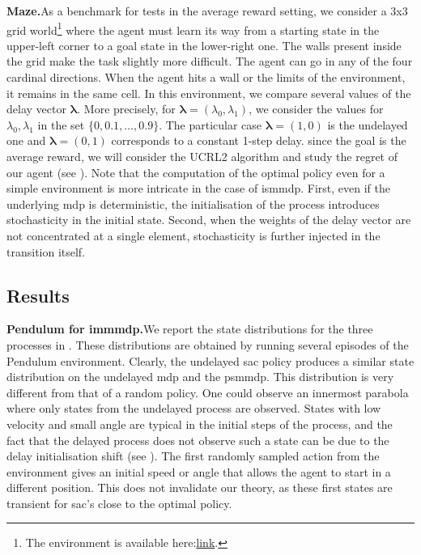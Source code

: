 \noindent\textbf{Maze.}\indent As a benchmark for tests in the average reward setting, we consider a 3x3 grid world\footnote{The environment is available here:\href{https://github.com/MattChanTK/gym-maze}{link}.} where the agent must learn its way from a starting state in the upper-left corner to a goal state in the lower-right one. 
The walls present inside the grid make the task slightly more difficult. 
The agent can go in any of the four cardinal directions.
When the agent hits a wall or the limits of the environment, it remains in the same cell. 
In this environment, we compare several values of the delay vector $\boldsymbol\lambda$. 
More precisely, for $\boldsymbol\lambda=(\lambda_0,\lambda_1)$, we consider the values for $\lambda_0,\lambda_1$ in the set $\{0,0.1,\dots,0.9\}$.
The particular case $\boldsymbol\lambda=(1,0)$ is the undelayed one and $\boldsymbol\lambda=(0,1)$ corresponds to a constant 1-step delay.
since the goal is the average reward, we will consider the UCRL2 algorithm and study the regret of our agent (see ).
Note that the computation of the optimal policy even for a simple environment is more intricate in the case of \gls{ismmdp}. 
First, even if the underlying \gls{mdp} is deterministic, the initialisation of the process introduces stochasticity in the initial state.
Second, when the weights of the delay vector are not concentrated at a single element, stochasticity is further injected in the transition itself.

\subsection{Results}
\label{subsec:results_mtd}

\noindent\textbf{Pendulum for \gls{immmdp}.}\indent We report the state distributions for the three processes in . 
These distributions are obtained by running several episodes of the Pendulum environment. 
Clearly, the undelayed \gls{sac} policy produces a similar state distribution on the undelayed \gls{mdp} and the \gls{psmmdp}.
This distribution is very different from that of a random policy.
One could observe an innermost parabola where only states from the undelayed process are observed.   
States with low velocity and small angle are typical in the initial steps of the process, and the fact that the delayed process does not observe such a state can be due to the delay initialisation shift (see ). 
The first randomly sampled action from the environment gives an initial speed or angle that allows the agent to start in a different position.
This does not invalidate our theory, as these first states are transient for \gls{sac}'s close to the optimal policy. 


